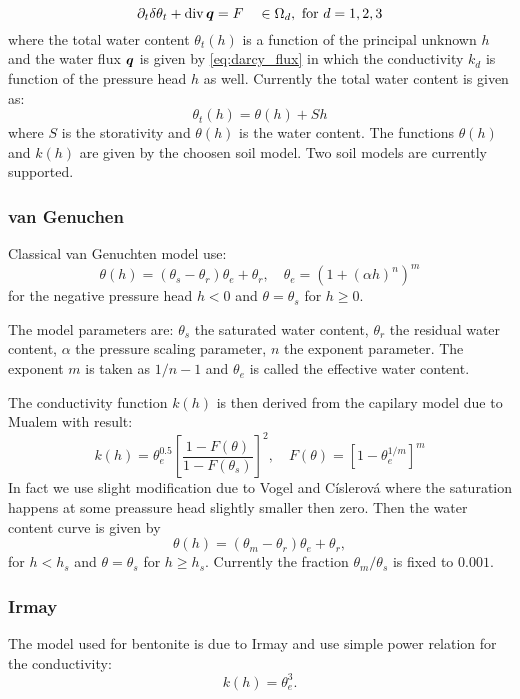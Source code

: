 \begin{equation}
 \partial_t \delta \theta_t + \operatorname{div} \mathbf{\boldsymbol{q}} = F\quad \in\Omega_d, \text{ for } d=1,2,3
\end{equation}
where the total water content $\theta_t(h)$ \units{}{}{} is a function of the principal unknown $h$ and the water flux $\mathbf{\boldsymbol{q}}$ is given by \eqref{eq:darcy_flux} 
in which the conductivity $k_d$ is function of the pressure head $h$ as well.
Currently the total water content is given as:
\begin{equation}
    \theta_t(h) = \theta(h) + Sh
\end{equation}
where $S$ is the storativity and $\theta(h)$ is the water content. The functions $\theta(h)$ and $k(h)$ are given by the choosen soil model.
Two soil models are currently supported.

\subsubsection{van Genuchen}
Classical van Genuchten model use:
\[
    \theta(h) = (\theta_s-\theta_r)\theta_e + \theta_r,\quad \theta_e = (1+ (\alpha h)^n)^m
\]
for the negative pressure head $h<0$ and $\theta = \theta_s$ for $h\ge 0$.

The model parameters are:
    $\theta_s$ \units{}{}{} the saturated water content,
    $\theta_r$ \units{}{}{} the residual water content,
    $\alpha$  the pressure scaling parameter,
    $n$ \units{}{}{} the exponent parameter.
The exponent $m$ is taken as $1/n-1$ and $\theta_e$ \units{}{}{} is called the effective water content.

The conductivity function $k(h)$ is then derived from the capilary model due to Mualem with result:
\[
    k(h) = \theta_e^{0.5} \left[ \frac{1-F(\theta)}{1-F(\theta_s)} \right]^2,\quad F(\theta)= \left[ 1- \theta_e^{1/m} \right]^m
\]
In fact we use slight modification due to Vogel and Císlerová where the saturation happens at some preassure head slightly smaller then zero.
Then the water content curve is given by 
\[
    \theta(h) = (\theta_m-\theta_r)\theta_e + \theta_r,
\]
for $h< h_s$ and $\theta = \theta_s$ for $h\ge h_s$. Currently the fraction $\theta_m / \theta_s$ is fixed to $0.001$.

\subsubsection{Irmay}
The model used for bentonite is due to Irmay and use simple power relation for the conductivity:
\[
   k(h) = \theta_e^{3}.
\]



    

